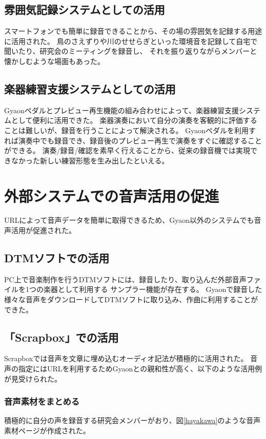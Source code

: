 \subsection{雰囲気記録システムとしての活用}
スマートフォンでも簡単に録音できることから、その場の雰囲気を記録する用途に活用された。
鳥のさえずりや川のせせらぎといった環境音を記録して自宅で聞いたり、研究会のミーティングを録音し、
それを振り返りながらメンバーと懐かしむような場面もあった。

\subsection{楽器練習支援システムとしての活用}
Gyaonペダルとプレビュー再生機能の組み合わせによって、楽器練習支援システムとして便利に活用できた。
楽器演奏において自分の演奏を客観的に評価することは難しいが、録音を行うことによって解決される。
Gyaonペダルを利用すれば演奏中でも録音でき、録音後のプレビュー再生で演奏をすぐに確認することができる。
演奏/録音/確認を素早く行えることから、従来の録音機では実現できなかった新しい練習形態を生み出したといえる。


\section{外部システムでの音声活用の促進}
URLによって音声データを簡単に取得できるため、Gyaon以外のシステムでも音声活用が促進された。

\subsection{DTMソフトでの活用}
PC上で音楽制作を行うDTMソフトには、録音したり、取り込んだ外部音声ファイルを1つの楽器として利用する
サンプラー機能が存在する。
Gyaonで録音した様々な音声をダウンロードしてDTMソフトに取り込み、作曲に利用することができた。

\subsection{「Scrapbox」での活用}
Scrapboxでは音声を文章に埋め込むオーディオ記法が積極的に活用された。
音声の指定にはURLを利用するためGyaonとの親和性が高く、以下のような活用例が見受けられた。

\subsubsection{音声素材をまとめる}
積極的に自分の声を録音する研究会メンバーがおり、図\ref{hayakawa}のような音声素材ページが作成された。

